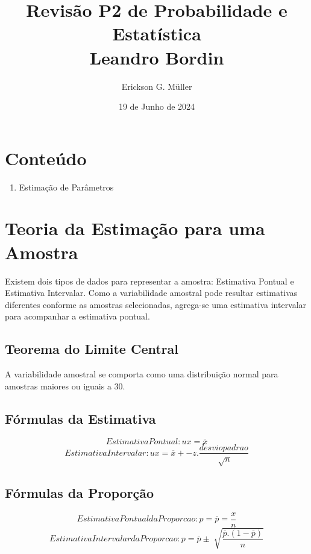 \documentclass[ ]{article}
\title{Revisão P2 de Probabilidade e Estatística \\ Leandro Bordin}
\author{Erickson G. Müller}
\date{19 de Junho de 2024}
\begin{document}
\maketitle
\section{Conteúdo}
\begin{enumerate}
	\item Estimação de Parâmetros
\end{enumerate}
\pagebreak

\section{Teoria da Estimação para uma Amostra}
	Existem dois tipos de dados para representar a amostra: Estimativa Pontual e Estimativa Intervalar. Como a variabilidade amostral pode resultar estimativas diferentes conforme as amostras selecionadas, agrega-se uma estimativa intervalar para acompanhar a estimativa pontual.

\subsection{Teorema do Limite Central}	
	A variabilidade amostral se	 comporta como uma distribuição normal para amostras maiores ou iguais a 30.

\subsection{Fórmulas da Estimativa}
	\begin{equation*}
		Estimativa Pontual: ux = \overline{x}
	\end{equation*}
	\begin{equation*}
		Estimativa Intervalar: ux = \overline{x} +- z.\dfrac{desvio padrao}{\sqrt[]{n}}
	\end{equation*}	
\subsection{Fórmulas da Proporção}
	\begin{equation*}
		Estimativa Pontual da Proporcao: p = \overline{p} = \dfrac{x}{n}
	\end{equation*}
	\begin{equation*}
		Estimativa Intervalar da Proporcao: p = \overline{p} \pm \sqrt[]{\dfrac{\overline{p}.(1-\overline{p})}{n}}
	\end{equation*}
\end{document}
